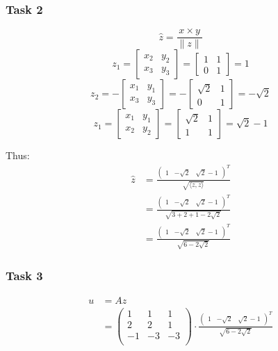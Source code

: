 \documentclass[tikz,14pt,fleqn]{article}
\begin{document}
\subsubsection*{Task 2}
\[ \hat{z} = \frac{x \times y}{\|z\|} \]
\[
z_1 =   
\begin{bmatrix}
x_2 & y_2\\
x_3 & y_3
\end{bmatrix} =
\begin{bmatrix}
1 & 1\\
0 & 1
\end{bmatrix} = 1
\]
\[
z_2 = -
\begin{bmatrix}
x_1 & y_1\\
x_3 & y_3
\end{bmatrix} = -
\begin{bmatrix}
\sqrt{2} & 1\\
0 & 1
\end{bmatrix} = -\sqrt{2}
\]
\[
z_1 = 
\begin{bmatrix}
x_1 & y_1\\
x_2 & y_2
\end{bmatrix} =
\begin{bmatrix}
\sqrt{2} & 1\\
1 & 1
\end{bmatrix} = \sqrt{2} - 1
\]

Thus:
\begin{align*}
\hat{z} &= \frac{\begin{pmatrix}1 & -\sqrt{2} & \sqrt{2}-1\end{pmatrix}^T}{\sqrt{\langle z,z \rangle}} \\
        &= \frac{\begin{pmatrix}1 & -\sqrt{2} & \sqrt{2}-1\end{pmatrix}^T}{\sqrt{3+2+1-2\sqrt{2}}} \\
        &= \frac{\begin{pmatrix}1 & -\sqrt{2} & \sqrt{2}-1\end{pmatrix}^T}{\sqrt{6-2\sqrt{2}}} 
\end{align*}
\subsubsection*{Task 3}
\begin{align*}
    u &= A z \\
    &= \begin{pmatrix}
1 & 1 & 1 \\
2 & 2 & 1 \\
-1 & -3 & -3 \\
\end{pmatrix} \cdot \frac{\begin{pmatrix}1 & -\sqrt{2} & \sqrt{2}-1\end{pmatrix}^T}{\sqrt{6-2\sqrt{2}}} 
\end{align*}
\end{document}
